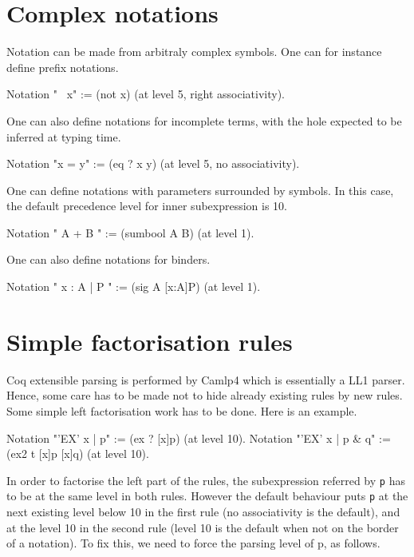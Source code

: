 \section{Complex notations}

Notation can be made from arbitraly complex symbols. One can for
instance define prefix notations.

\begin{coq_example*}
Notation "~ x" := (not x) (at level 5, right associativity).
\end{coq_example*}

One can also define notations for incomplete terms, with the hole
expected to be inferred at typing time.

\begin{coq_example*}
Notation "x = y" := (eq ? x y) (at level 5, no associativity).
\end{coq_example*}

One can define notations with parameters surrounded by symbols. In
this case, the default precedence level for inner subexpression is 10.

\begin{coq_example*}
Notation "{ A } + { B }" := (sumbool A B) (at level 1).
\end{coq_example*}

One can also define notations for binders.

\begin{coq_example*}
Notation "{ x : A  |  P }" := (sig A [x:A]P) (at level 1).
\end{coq_example*}

\section{Simple factorisation rules}

Coq extensible parsing is performed by Camlp4 which is essentially a
LL1 parser. Hence, some care has to be made not to hide already
existing rules by new rules. Some simple left factorisation work has
to be done. Here is an example.

\begin{coq_example*}
Notation "'EX' x | p"     := (ex ? [x]p) (at level 10).
Notation "'EX' x | p & q" := (ex2 t [x]p [x]q) (at level 10).
\end{coq_example*}

In order to factorise the left part of the rules, the subexpression
referred by {\tt p} has to be at the same level in both rules. However
the default behaviour puts {\tt p} at the next existing level below 10
in the first rule (no associativity is the default), and at the level
10 in the second rule (level 10 is the default when not on the border
of a notation). To fix this, we need to force the parsing level of p,
as follows.

